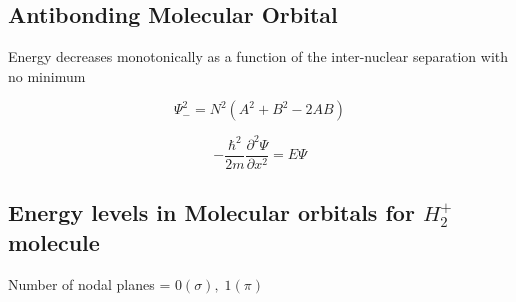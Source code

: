 \documentclass[12pt]{article}
\theoremstyle{definition}
\begin{document}
\subsection{Antibonding Molecular Orbital}

Energy decreases monotonically as a function of the inter-nuclear separation with no minimum

\begin{equation*}
	\Psi_-^2 = N^2 \left( A^2 + B^2 - 2AB \right)
\end{equation*}

\begin{equation*}
	- \frac{\hbar^2}{2m} \frac{\partial^2\Psi}{\partial x^2} = E\Psi
\end{equation*}

\subsection{Energy levels in Molecular orbitals for $H_2^+$ molecule}

Number of nodal planes = $0 (\sigma), \; 1(\pi)$
\end{document}

